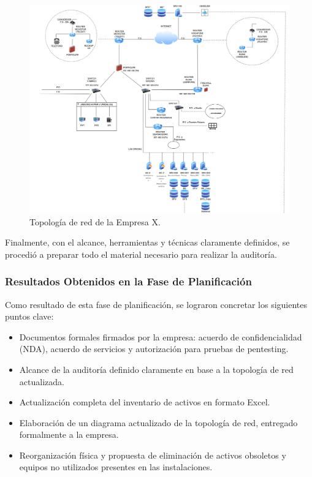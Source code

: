 \documentclass[a4paper, 11pt]{article}
\begin{document}
\begin{figure}[H]
  \centering
  \includegraphics[width=\textwidth]{images/topologia.png}
  \caption{Topología de red de la Empresa X.}
  \label{fig:topologia-red}
\end{figure}



Finalmente, con el alcance, herramientas y técnicas claramente definidos, se procedió a preparar todo el material necesario para realizar la auditoría. 





\subsubsection{Resultados Obtenidos en la Fase de Planificación}

Como resultado de esta fase de planificación, se lograron concretar los siguientes puntos clave:

\begin{itemize}
    \item Documentos formales firmados por la empresa: acuerdo de confidencialidad (NDA), acuerdo de servicios y autorización para pruebas de pentesting.
    \item Alcance de la auditoría definido claramente en base a la topología de red actualizada.
    \item Actualización completa del inventario de activos en formato Excel.
    \item Elaboración de un diagrama actualizado de la topología de red, entregado formalmente a la empresa.
    \item Reorganización física y propuesta de eliminación de activos obsoletos y equipos no utilizados presentes en las instalaciones.
\end{itemize}
\end{document}
